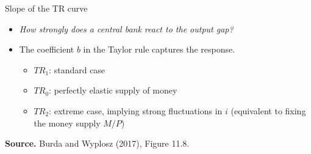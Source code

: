 \documentclass{beamer}
\newcommand{\tb}[1]{{\color{blue}{\textbf{#1}}}}
\begin{document}
\begin{frame}{Slope of the TR curve}

\begin{itemize}
\small
\item \emph{How strongly does a central bank react to the output gap?}
\item The coefficient $b$ in the Taylor rule captures the response.
\begin{itemize}
\small
\item $TR_1$: standard case
\item $TR_0$: perfectly elastic supply of money %
\item $TR_2$: extreme case, implying strong fluctuations in $i$ (equivalent to fixing the money supply $M/P$)
\end{itemize}
\end{itemize}

\begin{center}

\begin{figure}[h!]
	
\end{figure}

\begin{minipage}{0.6\columnwidth}
\tiny	
\textbf{Source.} Burda and Wyplosz (2017), Figure 11.8.\\
\end{minipage}
\end{center}

\end{frame}
\end{document}
